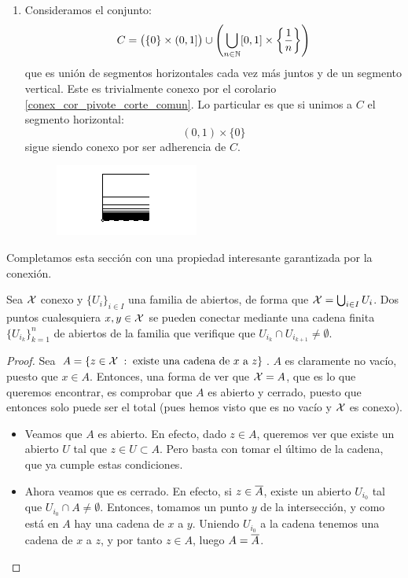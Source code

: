 \begin{exa}
\begin{enumerate}
		\item Consideramos el conjunto:
		\[C = \big(\{0\}\times (0,1]\big) \cup \left(\bigcup_{n\in\mathbb{N}} [0,1]\times\left\{\frac{1}{n}\right\}\right) \]
		que es unión de segmentos horizontales cada vez más juntos y de un segmento vertical. Este es trivialmente conexo por el corolario \ref{conex_cor_pivote_corte_comun}. Lo particular es que si unimos a $C$ el segmento horizontal:
		\[(0,1)\times\{0\}\]
		sigue siendo conexo por ser adherencia de $C$. 
		\begin{figure}[H]
			\centering
			\includegraphics[scale = 2.5]{img/lineas}
		\end{figure}
	\end{enumerate}
\end{exa}

Completamos esta sección con una propiedad interesante garantizada por la conexión.

\begin{lem}
	Sea $\mathcal{X}$ conexo y $\{U_i\}_{i\in I}$ una familia de abiertos, de forma que $\mathcal{X}=\bigcup_{i\in I} U_i$. Dos puntos cualesquiera $x,y\in\mathcal{X}$ se pueden conectar mediante una cadena finita $\{U_{i_k}\}_{k=1}^n$ de abiertos de la familia que verifique que $U_{i_k}\cap U_{i_{k+1}}\neq\emptyset$.
	
	\begin{proof}
		Sea $A=\{z\in\mathcal{X} \;:\; \text{existe una cadena de } x \text{ a } z \}$. $A$ es claramente no vacío, puesto que $x\in A$. Entonces, una forma de ver que $\mathcal{X}=A$, que es lo que queremos encontrar, es comprobar que $A$ es abierto y cerrado, puesto que entonces solo puede ser el total (pues hemos visto que es no vacío y $\mathcal{X}$ es conexo).
		
		\begin{itemize}
			\item Veamos que $A$ es abierto. En efecto, dado $z\in A$, queremos ver que existe un abierto $U$ tal que $z\in U\subset A$. Pero basta con tomar el último de la cadena, que ya cumple estas condiciones.
			
			\item Ahora veamos que es cerrado. En efecto, si $z\in\overline{A}$, existe un abierto $U_{i_0}$ tal que $U_{i_0}\cap A\neq\emptyset$. Entonces, tomamos un punto $y$ de la intersección, y como está en $A$ hay una cadena de $x$ a $y$. Uniendo $U_{i_0}$ a la cadena tenemos una cadena de $x$ a $z$, y por tanto $z\in A$, luego $A=\overline{A}$. \qedhere
		\end{itemize}
	\end{proof}
\end{lem}

